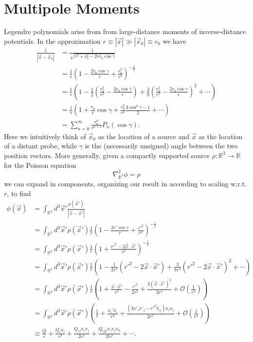 \documentclass[11pt,letterpaper]{article}
\newcommand{\LP}{\left(}
\newcommand{\RP}{\right)}
\newcommand{\mc}[1]{\mathcal{#1}}
\newcommand{\R}{\mathbb{R}}
\begin{document}
\section{Multipole Moments}
Legendre polynomials arise from from large-distance moments of inverse-distance potentials. In the approximation $r \equiv \left| \vec{x} \right| \gg \left| \vec{x}_0 \right| \equiv r_0$ we have \begin{equation}
\begin{aligned}
\frac{1}{\left| \vec{x} - \vec{x}_0 \right|} & = \frac{1}{\sqrt{r^2 + r_0^2 - 2 r r_0 \cos \gamma}} \\
& = \frac{1}{r} \LP 1 - \frac{2r_0 \cos \gamma}{r} + \frac{r_0^2}{r^2} \RP^{-\frac{1}{2}} \\
& = \frac{1}{r} \LP 1 - \frac{1}{2} \LP \frac{r_0^2}{r^2} - \frac{2r_0 \cos \gamma}{r} \RP + \frac{3}{8} \LP \frac{r_0^2}{r^2} - \frac{2r_0 \cos \gamma}{r} \RP^2 + \cdots  \RP \\
& = \frac{1}{r} \LP 1 + \frac{r_0}{r} \cos \gamma + \frac{r_0^2}{r^2} \frac{3 \cos^2 \gamma - 1}{2}  + \cdots \RP \\
& = \sum_{n=0}^\infty \frac{r_0^n}{r^{n+1}} P_n(\cos \gamma).
\end{aligned}
\end{equation}
Here we intuitively think of $\vec{x}_0$ as the location of a source and $\vec{x}$ as the location of a distant probe, while $\gamma$ is the (necessarily unsigned) angle between the two position vectors. More generally, given a compactly supported source $\rho: \R^3 \to \R$ for the Poisson equation \begin{equation}
\nabla^2_{\R^3} \phi = \rho
\end{equation}
we can expand in components, organizing our result in according to scaling w.r.t. $r$, to find \begin{equation}
\begin{aligned}
\phi(\vec{x}) & = \int_{\R^3} d^3 \vec{x}' \frac{\rho(\vec{x}')}{|\vec{x} - \vec{x}'|} \\
& = \int_{\R^3} d^3 \vec{x}' \rho(\vec{x}') \frac{1}{r} \LP 1 - \frac{2r' \cos \gamma}{r} + \frac{{r'}^2}{r^2} \RP^{-\frac{1}{2}} \\
& = \int_{\R^3} d^3 \vec{x}' \rho(\vec{x}') \frac{1}{r} \LP 1 + \frac{{r'}^2 - 2 \vec{x} \cdot \vec{x}'}{r^2} \RP^{-\frac{1}{2}} \\
& = \int_{\R^3} d^3 \vec{x}' \rho(\vec{x}') \frac{1}{r} \LP 1 - \frac{1}{2 r^2} \LP {r'}^2 - 2 \vec{x} \cdot \vec{x}' \RP + \frac{3}{8r^4} \LP {r'}^2 - 2 \vec{x} \cdot \vec{x}' \RP^2 + \cdots \RP \\
& = \int_{\R^3} d^3 \vec{x}' \rho(\vec{x}') \frac{1}{r} \LP 1 + \frac{\vec{x} \cdot \vec{x}'}{r^2} - \frac{{r'}^2}{2r^2}  + \frac{3 (\vec{x} \cdot \vec{x}')^2}{2 r^4} + \mc{O} \LP \frac{1}{r^3} \RP \RP \\
& = \int_{\R^3} d^3 \vec{x}' \rho(\vec{x}')  \LP \frac{1}{r} + \frac{x_i' x_i}{r^3}  + \frac{\LP 3 x'_i x'_j  - {r'}^2 \delta_{ij} \RP x_i x_j}{2 r^5} + \mc{O} \LP \frac{1}{r^4} \RP \RP \\
& \equiv \frac{Q}{r} + \frac{Q_i x_i}{r^3} + \frac{Q_{ij} x_i x_j}{2 r^5} + \frac{Q_{ijk} x_i x_j x_k}{3! r^7} + \cdots.
\end{aligned}
\end{equation}
\end{document}
